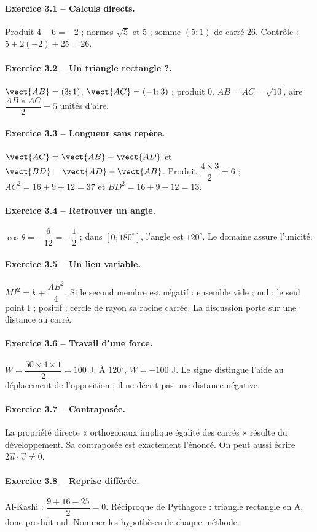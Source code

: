 \paragraph{Exercice 3.1 -- Calculs directs.} Produit $4-6=-2$ ; normes $\sqrt5$ et 5 ; somme $(5;1)$ de carré 26. Contrôle : $5+2(-2)+25=26$.
\paragraph{Exercice 3.2 -- Un triangle rectangle ?.} $\vect{AB}=(3;1)$, $\vect{AC}=(-1;3)$ ; produit 0. $AB=AC=\sqrt{10}$, aire $\dfrac{AB\times AC}{2}=5$ unités d’aire.
\paragraph{Exercice 3.3 -- Longueur sans repère.} $\vect{AC}=\vect{AB}+\vect{AD}$ et $\vect{BD}=\vect{AD}-\vect{AB}$. Produit $\dfrac{4\times 3}{2}=6$ ; $AC^2=16+9+12=37$ et $BD^2=16+9-12=13$.
\paragraph{Exercice 3.4 -- Retrouver un angle.} $\cos \theta =-\dfrac{6}{12}=-\dfrac{1}{2}$ ; dans $[0;180^\circ]$, l’angle est $120^\circ$. Le domaine assure l’unicité.
\paragraph{Exercice 3.5 -- Un lieu variable.} $MI^2=k+\dfrac{AB^2}{4}$. Si le second membre est négatif : ensemble vide ; nul : le seul point I ; positif : cercle de rayon sa racine carrée. La discussion porte sur une distance au carré.
\paragraph{Exercice 3.6 -- Travail d’une force.} $W=\dfrac{50\times 4\times 1}{2}=100$ J. À $120^\circ$, $W=-100$ J. Le signe distingue l’aide au déplacement de l’opposition ; il ne décrit pas une distance négative.
\paragraph{Exercice 3.7 -- Contraposée.} La propriété directe « orthogonaux implique égalité des carrés » résulte du développement. Sa contraposée est exactement l’énoncé. On peut aussi écrire $2\vec u\cdot\vec v\ne0$.
\paragraph{Exercice 3.8 -- Reprise différée.} Al-Kashi : $\dfrac{9+16-25}{2}=0$. Réciproque de Pythagore : triangle rectangle en A, donc produit nul. Nommer les hypothèses de chaque méthode.
